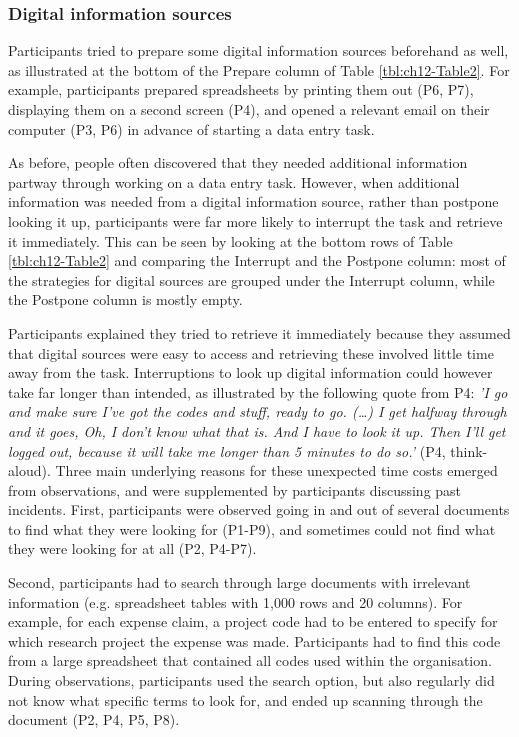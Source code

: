 \subsubsection{Digital information sources}
Participants tried to prepare some digital information sources beforehand as well, as illustrated at the bottom of the Prepare column of Table \ref{tbl:ch12-Table2}. For example, participants prepared spreadsheets by printing them out (P6, P7), displaying them on a second screen (P4), and opened a relevant email on their computer (P3, P6) in advance of starting a data entry task. 

As before, people often discovered that they needed additional information partway through working on a data entry task. However, when additional information was needed from a digital information source, rather than postpone looking it up, participants were far more likely to interrupt the task and retrieve it immediately. This can be seen by looking at the bottom rows of Table \ref{tbl:ch12-Table2}  and comparing the Interrupt and the Postpone column: most of the strategies for digital sources are grouped under the Interrupt column, while the Postpone column is mostly empty.  

Participants explained they tried to retrieve it immediately because they assumed that digital sources were easy to access and retrieving these involved little time away from the task. Interruptions to look up digital information could however take far longer than intended, as illustrated by the following quote from P4: \textit{'I go and make sure I’ve got the codes and stuff, ready to go. (…) I get halfway through and it goes, Oh, I don’t know what that is. And I have to look it up. Then I’ll get logged out, because it will take me longer than 5 minutes to do so.'} (P4, think-aloud). Three main underlying reasons for these unexpected time costs emerged from observations, and were supplemented by participants discussing past incidents. First, participants were observed going in and out of several documents to find what they were looking for (P1-P9), and sometimes could not find what they were looking for at all (P2, P4-P7). 

Second, participants had to search through large documents with irrelevant information (e.g. spreadsheet tables with 1,000 rows and 20 columns). For example, for each expense claim, a project code had to be entered to specify for which research project the expense was made. Participants had to find this code from a large spreadsheet that contained all codes used within the organisation. During observations, participants used the search option, but also regularly did not know what specific terms to look for, and ended up scanning through the document (P2, P4, P5, P8). 

